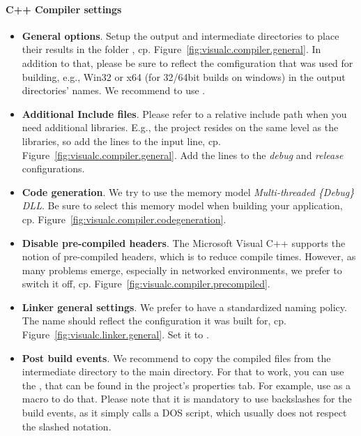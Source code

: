 \paragraph{C++ Compiler settings}
\begin{itemize}
\item \textbf{General options}. 
Setup the output and intermediate directories to place their results in the folder , cp. Figure~\ref{fig:visualc.compiler.general}.
In addition to that, please be sure to reflect the comfiguration that was used for building, e.g., Win32 or x64 (for 32/64bit builds on windows) in the output directories' names.
We recommend to use .
\item \textbf{Additional Include files}. 
Please refer to a relative include path when you need additional libraries. 
E.g., the  project resides on the same level as the  libraries, so add the lines  to the input line, cp. Figure~\ref{fig:visualc.compiler.general}. 
Add the lines to the \emph{debug} and \emph{release} configurations.
\item \textbf{Code generation}. 
We try to use the memory model \emph{Multi-threaded \{Debug\} DLL}.
Be sure to select this memory model when building your application, cp. Figure~\ref{fig:visualc.compiler.codegeneration}.
\item \textbf{Disable pre-compiled headers}. 
The Microsoft Visual C++ supports the notion of pre-compiled headers, which is to reduce compile times. 
However, as many problems emerge, especially in networked environments, we prefer to switch it off, cp. Figure~\ref{fig:visualc.compiler.precompiled}.
\item \textbf{Linker general settings}. 
We prefer to have a standardized naming policy. 
The name should reflect the configuration it was built for, cp. Figure~\ref{fig:visualc.linker.general}.
Set it to .
\item \textbf{Post build events}.
We recommend to copy the compiled files from the intermediate directory to the main directory. 
For that to work, you can use the , that can be found in the project's properties  tab.
For example, use  as a macro to do that.
Please note that it is mandatory to use backslashes for the build events, as it simply calls a DOS script, which usually does not respect the slashed notation.
\end{itemize}

